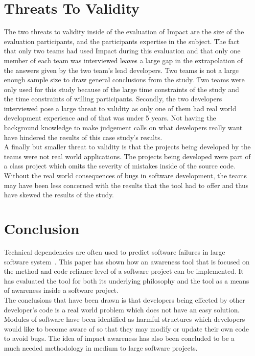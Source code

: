 \documentclass[conference]{IEEEtran}
\begin{document}
\section{Threats To Validity}
The two threats to validity inside of the evaluation of Impact are the size of the evaluation
participants, and the participants expertise in the subject. The fact that only two teams had
used Impact during this evaluation and that only one member of each team was interviewed
leaves a large gap in the extrapolation of the answers given by the two team's lead 
developers. Two teams is not a large enough sample size to draw general conclusions
from the study. Two teams were only used for this study because of the large time constraints
of the study and the time constraints of willing participants. Secondly, the two developers
interviewed pose a large threat to validity as only one of them had real world development
experience and of that was under 5 years. Not having the background knowledge to make
judgement calls on what developers really want have hindered the results of this case study’s 
results. \\

A finally but smaller threat to validity is that the projects being developed by the teams were
not real world applications. The projects being developed were part of a class project which
omits the severity of mistakes inside of the source code. Without the real world consequences
of bugs in software development, the teams may have been less concerned with the results
that the tool had to offer and thus have skewed the results of the study.\\

\section{Conclusion}
Technical dependencies are often used to predict software failures
in large software system~\cite{Pinzger:2008:DNP, Zimmermann:2008:PDU, Kim:2006:AIB}. 
This paper has shown how an awareness tool that is focused on the method and code reliance
level of a software project can be implemented. It has evaluated the tool for both its underlying
philosophy and the tool as a means of awareness inside a software project. \\

The conclusions that have been drawn is that developers being effected by other developer's
code is a real world problem which does not have an easy solution. Modules of software
have been identified as harmful structures which developers would like to become
aware of so that they may modify or update their own code to avoid bugs. The idea of
impact awareness has also been concluded to be a much needed methodology in 
medium to large software projects.\\
\end{document}
